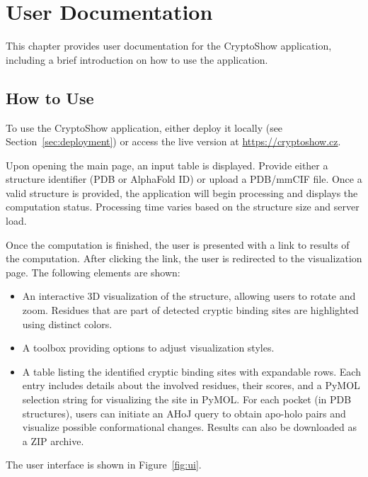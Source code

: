 \chapter{User Documentation}
\label{chap:user-documentation}

This chapter provides user documentation for the CryptoShow application, including a brief introduction on how to use the application.

\section{How to Use}
\label{sec:how-to-use}

To use the CryptoShow application, either deploy it locally (see Section~\ref{sec:deployment}) or access the live version at \url{https://cryptoshow.cz}.

Upon opening the main page, an input table is displayed. Provide either a structure identifier (PDB or AlphaFold ID) or upload a PDB/mmCIF file. Once a valid structure is provided, the application will begin processing and displays the computation status. Processing time varies based on the structure size and server load.

Once the computation is finished, the user is presented with a link to results of the computation. After clicking the link, the user is redirected to the visualization page. The following elements are shown:

\begin{itemize}
    \item An interactive 3D visualization of the structure, allowing users to rotate and zoom. Residues that are part of detected cryptic binding sites are highlighted using distinct colors.
    \item A toolbox providing options to adjust visualization styles.
    \item A table listing the identified cryptic binding sites with expandable rows. Each entry includes details about the involved residues, their scores, and a PyMOL selection string for visualizing the site in PyMOL. For each pocket (in PDB structures), users can initiate an AHoJ query to obtain apo-holo pairs and visualize possible conformational changes. Results can also be downloaded as a ZIP archive.
\end{itemize}

The user interface is shown in Figure~\ref{fig:ui}.

